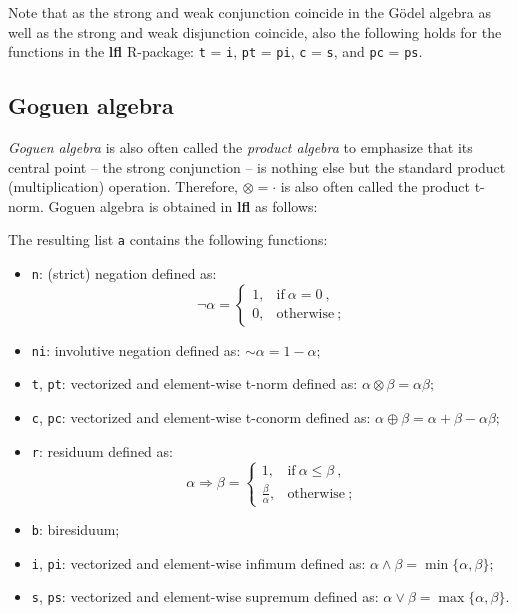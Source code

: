 \documentclass[review]{elsarticle}
\newcommand{\pkg}[1]{\textbf{#1}}
\newcommand{\code}[1]{\texttt{#1}}
\begin{document}
Note that as the strong and weak conjunction coincide in the G\"{o}del algebra as well as the strong and weak disjunction coincide, also the following holds for the  functions in the \pkg{lfl} R-package: \code{t} = \code{i}, \code{pt} = \code{pi}, \code{c} = \code{s}, and \code{pc} = \code{ps}.




\subsection{Goguen algebra}


\emph{Goguen algebra} is also often called the \emph{product algebra} to emphasize that its central point -- the strong conjunction -- is nothing else but the standard product (multiplication) operation. Therefore, $\otimes = \cdot$ is also often called the product t-norm. Goguen algebra is obtained in \pkg{lfl} as follows:
%

%
The resulting list \code{a} contains the following functions:
\begin{itemize}
    \item \code{n}: (strict) negation defined as:
    $$
    \lnot\alpha = \begin{cases}
    1, & \text{if}\ \alpha = 0\ , \\
    0, & \text{otherwise}
\ ;    \end{cases}
    $$
    \item \code{ni}: involutive negation defined as:
    ${\sim}\alpha = 1 - \alpha;$
    \item \code{t}, \code{pt}: vectorized and element-wise t-norm defined as:
    $\alpha \otimes \beta = \alpha\beta;$
    \item \code{c}, \code{pc}: vectorized and element-wise t-conorm defined as: $\alpha \oplus \beta = \alpha + \beta - \alpha\beta;$
    \item \code{r}: residuum defined as:
    $$
    \alpha\Rightarrow\beta = \begin{cases}
    1, & \text{if}\ \alpha\le\beta\ , \\
    \frac{\beta}{\alpha}, & \text{otherwise}\ ;
    \end{cases}
    $$
    \item \code{b}: biresiduum;
    \item \code{i}, \code{pi}: vectorized and element-wise infimum defined as:
    $\alpha \land \beta = \min\{\alpha, \beta\};$
    \item \code{s}, \code{ps}: vectorized and element-wise supremum defined as:
    $\alpha \lor \beta = \max\{\alpha, \beta\}.$
\end{itemize}
\end{document}
